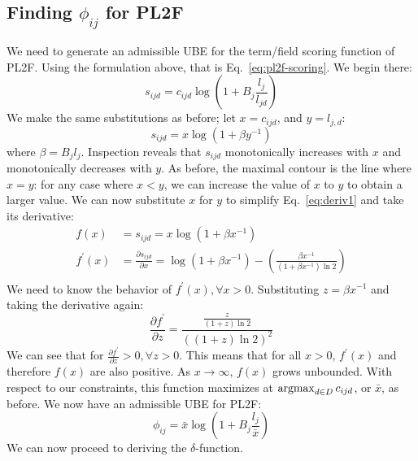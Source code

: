 \documentclass{sig-alternate}
\newcommand{\argmax}{\operatornamewithlimits{argmax}}
\begin{document}
\subsection{Finding $\phi_{ij}$ for PL2F}
We need to generate an admissible UBE for the term/field scoring function of PL2F. Using the formulation above, that is Eq.~\ref{eq:pl2f-scoring}. We begin there:
\begin{equation*}
s_{ijd} = c_{ijd} \log \left(1 + B_{j}\frac{l_{j}}{l_{jd}} \right)
\end{equation*}
We make the same substitutions as before; let $x = c_{ijd}$, and $y = l_{j,d}$:
\begin{equation}
s_{ijd} = x \log \left(1 + \beta y^{-1} \right) \label{eq:deriv1}
\end{equation}
where $\beta = B_{j}l_{j}$. Inspection reveals that $s_{ijd}$ monotonically increases with $x$ and monotonically decreases with $y$. As before, the maximal contour is the line where $x = y$: for any case where $x < y$, we can increase the value of $x$ to $y$ to obtain a larger value. We can now substitute $x$ for $y$ to simplify Eq.~\ref{eq:deriv1} and take its derivative:
\begin{align*}
f(x) &= s_{ijd} = x \log \left(1 + \beta x^{-1} \right) \\
f^{\prime}(x) &= \frac{\partial s_{ijd}}{\partial x} = \log (1 + \beta x^{-1}) - \left( \frac{\beta x^{-1}}{(1+\beta x^{-1}) \ln 2} \right) \\
\end{align*}
We need to know the behavior of $f^{\prime}(x), \forall x > 0$. Substituting $z = \beta x^{-1}$ and taking the derivative again:
\begin{equation*}
\frac{\partial f^{\prime}}{\partial z} = \frac{\frac{z}{(1+z) \ln 2}}{((1+z) \ln 2)^{2}}
\end{equation*}
We can see that for $\frac{\partial f^{\prime}}{\partial z} > 0,  \forall z > 0$. This means that for all $x > 0$, $f^{\prime}(x)$ and therefore $f(x)$ are also positive. 
As $x \rightarrow \infty$, $f(x)$ grows unbounded. With respect to our constraints, this function maximizes at $\argmax_{d \in D} c_{ijd}$, or ${\bar x}$, as before. We now have an admissible UBE for PL2F:
\begin{equation*}
\phi_{ij} = {\bar x} \log \left(1 + B_{j}\frac{l_{j}}{{\bar x}} \right)
\end{equation*}
We can now proceed to deriving the $\delta$-function.
\end{document}
